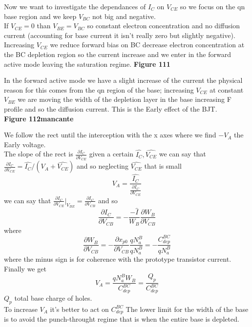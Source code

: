 Now we want to investigate the dependances of $I_C$ on $V_{CE}$ so we focus on the qn base region and we keep $V_{BC}$ not big and negative.\\
If $V_{CE}=0$ than $V_{BE}=V_{BC}$ so constant electron concentration and no diffusion current (accounting for base current it isn't really zero but slightly negative).
Increasing $V_{CE}$ we reduce forward bias on BC decrease electron concentration at the BC depletion region so the current increase and we enter in the forward active mode leaving the saturation regime.
\centering
{\bf Figure 111}\\
\raggedright
In the forward active mode we have a slight increase of the current the physical reason for this comes from the qn region of the base; increasing $V_{CE}$ at constant $V_{BE}$ we are moving the width of the depletion layer in the base increasing F profile and so the diffusion current. This is the Early effect of the BJT.\\
\centering
{\bf Figure 112mancante}\\
\raggedright
We follow the rect until the interception with the x axes where we find $-V_A$ the Early voltage.\\
The slope of the rect is $\frac{\partial I_C}{\partial V_{CE}}$ given a certain $\hat{I_C},\hat{V_{CE}}$ we can say that $\frac{\partial I_C}{\partial V_{CE}}=\hat{I_C}/(V_A+\hat{V_{CE}})$ and so neglecting $\hat{V_{CE}}$ that is small
\begin{equation}
V_A=\frac{\hat{I_C}}{\frac{\partial I_C}{\partial V_{CE}}}
\end{equation}
we can say that $\frac{\partial I_C}{\partial V_{CE}}|_{V_{BE}}=\frac{\partial I_C}{\partial V_{CB}}$ and so
\begin{equation}
\frac{\partial I_C}{\partial V_{CB}}=-\frac{-\hat{I}}{W_B}\frac{\partial W_B }{\partial V_{CB}}
\end{equation}
where
\begin{equation}
\frac{\partial W_B }{\partial V_{CB}}=-\frac{\partial x_{p0}}{\partial V_{CB}}\frac{qN_a^B}{qN_a^B}=-\frac{C_{dep}^{BC}}{qN_a^B}
\end{equation}
where the minus sign is for coherence with the prototype transistor current.
Finally we get
\begin{equation}
V_A=\frac{qN_a^BW_B}{C_{dep}^{BC}}=\frac{Q_p}{C_{dep}^{BC}}
\end{equation}
$Q_p$ total base charge of holes.\\
To increase $V_A$ it's better to act on $C_{dep}^{BC}$
The lower limit for the width of the base is to avoid the punch-throught regime that is when the entire base is depleted.\\

